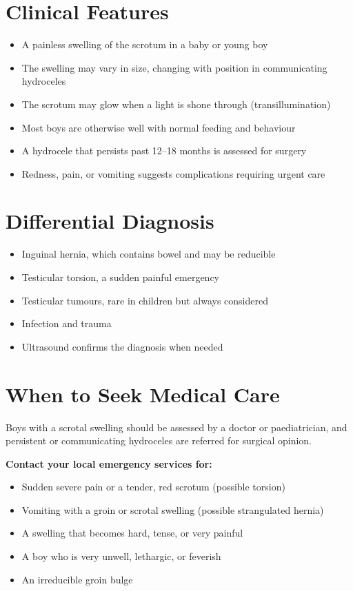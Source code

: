 \section*{Clinical Features}
\begin{itemize}
    \item A painless swelling of the scrotum in a baby or young boy
    \item The swelling may vary in size, changing with position in communicating hydroceles
    \item The scrotum may glow when a light is shone through (transillumination)
    \item Most boys are otherwise well with normal feeding and behaviour
    \item A hydrocele that persists past 12--18 months is assessed for surgery
    \item Redness, pain, or vomiting suggests complications requiring urgent care
\end{itemize}

\section*{Differential Diagnosis}
\begin{itemize}
    \item Inguinal hernia, which contains bowel and may be reducible
    \item Testicular torsion, a sudden painful emergency
    \item Testicular tumours, rare in children but always considered
    \item Infection and trauma
    \item Ultrasound confirms the diagnosis when needed
\end{itemize}

\section*{When to Seek Medical Care}
Boys with a scrotal swelling should be assessed by a doctor or paediatrician, and persistent or communicating hydroceles are referred for surgical opinion.

\textbf{Contact your local emergency services for:}
\begin{itemize}
    \item Sudden severe pain or a tender, red scrotum (possible torsion)
    \item Vomiting with a groin or scrotal swelling (possible strangulated hernia)
    \item A swelling that becomes hard, tense, or very painful
    \item A boy who is very unwell, lethargic, or feverish
    \item An irreducible groin bulge
\end{itemize}


